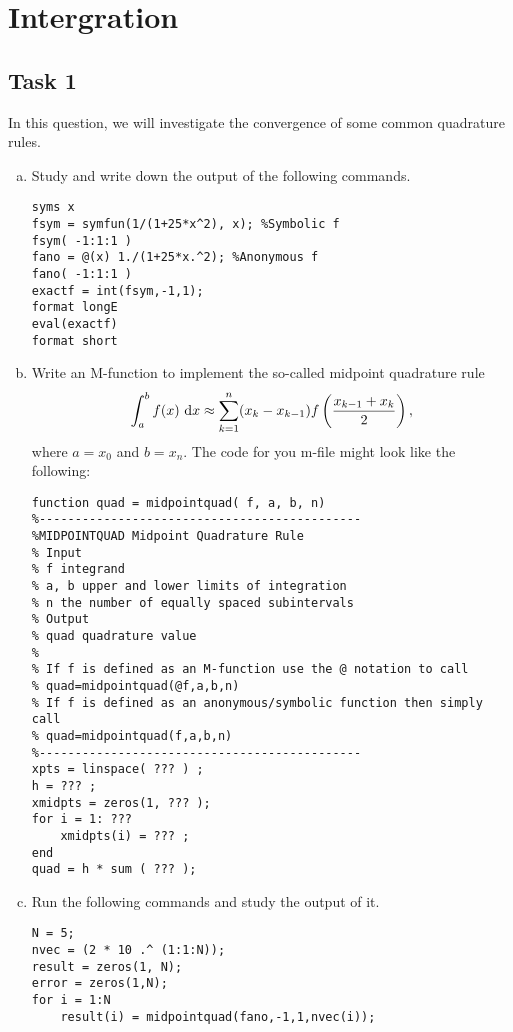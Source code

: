 \chapter{Intergration}

\section*{Task 1}
In this question, we will investigate the convergence of some common quadrature rules.
\begin{enumerate}[(a)]
	\item Study and write down the output of the following commands.
	\begin{lstlisting}[style=Matlab-editor]
syms x
fsym = symfun(1/(1+25*x^2), x); %Symbolic f
fsym( -1:1:1 )
fano = @(x) 1./(1+25*x.^2); %Anonymous f
fano( -1:1:1 )
exactf = int(fsym,-1,1);
format longE
eval(exactf)
format short
	\end{lstlisting}
	\item Write an M-function to implement the so-called midpoint quadrature rule
	\[ \int_{a}^{b}f(x)~\mathrm{d} x\approx \sum_{k=1}^n(x_k-x_{k-1})f\left(\frac{x_{k-1}+x_k}{2}\right),\]
	where \(a=x_0\) and \(b=x_n\).
	The code for you m-file might look like the following:
	\begin{lstlisting}[style=Matlab-editor]
function quad = midpointquad( f, a, b, n)
%---------------------------------------------
%MIDPOINTQUAD Midpoint Quadrature Rule
% Input
% f integrand
% a, b upper and lower limits of integration
% n the number of equally spaced subintervals
% Output
% quad quadrature value
%
% If f is defined as an M-function use the @ notation to call
% quad=midpointquad(@f,a,b,n)
% If f is defined as an anonymous/symbolic function then simply call
% quad=midpointquad(f,a,b,n)
%---------------------------------------------
xpts = linspace( ??? ) ;
h = ??? ;
xmidpts = zeros(1, ??? );
for i = 1: ???
	xmidpts(i) = ??? ;
end
quad = h * sum ( ??? );
	\end{lstlisting}
	\item Run the following commands and study the output of it.
	\begin{lstlisting}[style=Matlab-editor]
N = 5;
nvec = (2 * 10 .^ (1:1:N));
result = zeros(1, N);
error = zeros(1,N);
for i = 1:N
	result(i) = midpointquad(fano,-1,1,nvec(i));

\end{lstlisting}
\end{enumerate}
